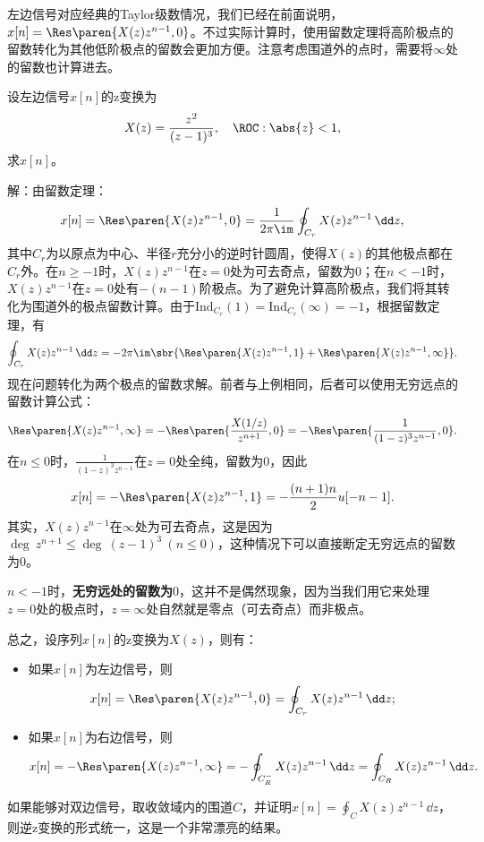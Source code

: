 左边信号对应经典的Taylor级数情况，我们已经在前面说明，$x[n]=\Res\paren{X(z)z^{n-1},0}$。不过实际计算时，使用留数定理将高阶极点的留数转化为其他低阶极点的留数会更加方便。注意考虑围道外的点时，需要将$\infty$处的留数也计算进去。
\begin{example}
    设左边信号$x[n]$的z变换为
    \begin{equation}
        X(z)=\frac{z^2}{(z-1)^3},\quad \ROC:\abs{z}<1,
    \end{equation}
    求$x[n]$。

    解：由留数定理：
    \begin{equation}
        x[n]=\Res\paren{X(z)z^{n-1},0}=\frac{1}{2\pi\im}\oint_{C_r}X(z)z^{n-1}\,\dd z,
    \end{equation}
    其中$C_r$为以原点为中心、半径$r$充分小的逆时针圆周，使得$X(z)$的其他极点都在$C_r$外。在$n\geq -1$时，$X(z)z^{n-1}$在$z=0$处为可去奇点，留数为$0$；在$n<-1$时，$X(z)z^{n-1}$在$z=0$处有$-(n-1)$阶极点。为了避免计算高阶极点，我们将其转化为围道外的极点留数计算。由于$\mathrm{Ind}_{C_r}(1)=\mathrm{Ind}_{C_r}(\infty)=-1$，根据留数定理，有
    \begin{equation}
        \oint_{C_r}X(z)z^{n-1}\,\dd z=-2\pi\im\sbr{\Res\paren{X(z)z^{n-1},1}+\Res\paren{X(z)z^{n-1},\infty}}.
    \end{equation}
    现在问题转化为两个极点的留数求解。前者与上例相同，后者可以使用无穷远点的留数计算公式：
    \begin{equation}
        \Res\paren{X(z)z^{n-1},\infty}=-\Res\paren{\frac{X(1/z)}{z^{n+1}},0}=-\Res\paren{\frac{1}{(1-z)^3 z^{n-1}},0}.
    \end{equation}
    在$n\leq 0$时，$\displaystyle\frac{1}{(1-z)^3 z^{n-1}}$在$z=0$处全纯，留数为$0$，因此
    \begin{equation}
        x[n]=-\Res\paren{X(z)z^{n-1},1}=-\frac{(n+1)n}{2}u[-n-1].
    \end{equation}
    其实，$X(z)z^{n-1}$在$\infty$处为可去奇点，这是因为$\deg\ z^{n+1}\leq\deg\ (z-1)^3\ (n\leq 0)$，这种情况下可以直接断定无穷远点的留数为$0$。
\end{example}

$n<-1$时，\textbf{无穷远处的留数为$0$}，这并不是偶然现象，因为当我们用它来处理$z=0$处的极点时，$z=\infty$处自然就是零点（可去奇点）而非极点。

总之，设序列$x[n]$的z变换为$X(z)$，则有：
\begin{itemize}
    \item 如果$x[n]$为左边信号，则
          \begin{equation}
              x[n]=\Res\paren{X(z)z^{n-1},0}=\oint_{C_r}X(z)z^{n-1}\,\dd z;
          \end{equation}
    \item 如果$x[n]$为右边信号，则
          \begin{equation}
              x[n]=-\Res\paren{X(z)z^{n-1},\infty}=-\oint_{C^-_R}X(z)z^{n-1}\,\dd z=\oint_{C_R}X(z)z^{n-1}\,\dd z.
          \end{equation}
\end{itemize}
如果能够对双边信号，取收敛域内的围道$C$，并证明$x[n]=\oint_{C}X(z)z^{n-1}\,\dd z$，则逆z变换的形式统一，这是一个非常漂亮的结果。

